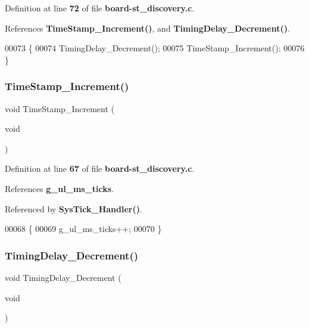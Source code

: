 Definition at line \textbf{ 72} of file \textbf{ board-\/st\+\_\+discovery.\+c}.



References \textbf{ Time\+Stamp\+\_\+\+Increment()}, and \textbf{ Timing\+Delay\+\_\+\+Decrement()}.


\begin{DoxyCode}
00073 \{
00074     TimingDelay_Decrement();
00075     TimeStamp_Increment();
00076 \}
\end{DoxyCode}
\mbox{\label{board-st__discovery_8c_aa0f23fa6d9e0612a89ae0a56520798c4}} 
\subsubsection{Time\+Stamp\+\_\+\+Increment()}
{\footnotesize\ttfamily void Time\+Stamp\+\_\+\+Increment (\begin{DoxyParamCaption}\item[{void}]{ }\end{DoxyParamCaption})}



Definition at line \textbf{ 67} of file \textbf{ board-\/st\+\_\+discovery.\+c}.



References \textbf{ g\+\_\+ul\+\_\+ms\+\_\+ticks}.



Referenced by \textbf{ Sys\+Tick\+\_\+\+Handler()}.


\begin{DoxyCode}
00068 \{
00069     g_ul_ms_ticks++;
00070 \}
\end{DoxyCode}
\mbox{\label{board-st__discovery_8c_aeb4c4307d28035637f0280cce42553fe}} 
\subsubsection{Timing\+Delay\+\_\+\+Decrement()}
{\footnotesize\ttfamily void Timing\+Delay\+\_\+\+Decrement (\begin{DoxyParamCaption}\item[{void}]{ }\end{DoxyParamCaption})}



